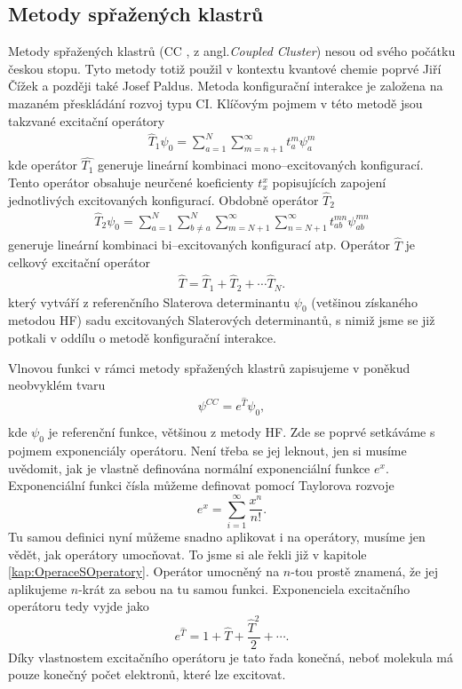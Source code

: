 \subsection{Metody spřažených klastrů}
Metody spřažených klastrů (CC , z angl.\textit{Coupled Cluster}) nesou od svého počátku českou stopu. Tyto metody totiž použil v kontextu kvantové chemie poprvé Jiří Čížek a později také Josef Paldus. Metoda konfigurační interakce je založena na mazaném přeskládání rozvoj typu CI. Klíčovým pojmem v této metodě jsou takzvané excitační operátory
\begin{eqnarray}
\hat{T}_1\psi_0=\sum^N_{a=1}\sum_{m=n+1}^\infty t_a^m\psi_a^m 
\end{eqnarray}
kde operátor $\hat{T_1}$ generuje lineární kombinaci mono--excitovaných konfigurací.  Tento operátor obsahuje neurčené koeficienty $t_x^x$ popisujících zapojení jednotlivých excitovaných konfigurací. Obdobně operátor $\hat{T}_2$ 
\begin{eqnarray}
\hat{T}_2\psi_0=\sum_{a=1}^N \sum_{b\neq a}^N\sum_{m=N+1}^\infty \sum_{n=N+1}^\infty t_{ab}^{mn}\psi_{ab}^{mn}
\end{eqnarray}
generuje lineární kombinaci  bi--excitovaných konfigurací atp. Operátor $\hat{T}$ je celkový excitační operátor
\begin{eqnarray}
\hat{T}=\hat{T}_1+\hat{T}_2+\cdots \hat{T}_N.
\end{eqnarray}
který vytváří z referenčního Slaterova determinantu $\psi_0$ (vetšinou získaného metodou HF) sadu excitovaných Slaterových determinantů, s nimiž jsme se již potkali v oddílu o metodě konfigurační interakce. 


Vlnovou funkci v rámci metody spřažených klastrů zapisujeme v poněkud neobvyklém tvaru
\begin{eqnarray}
\psi^{CC} = e^{\hat{T}} \psi_0 ,  \\
\end{eqnarray}
kde $\psi_0$ je referenční funkce, většinou z metody HF. Zde se poprvé setkáváme s pojmem exponenciály operátoru. Není třeba se jej leknout, jen si musíme uvědomit, jak je vlastně definována normální exponenciální funkce $e^x$. Exponenciální funkci čísla můžeme definovat pomocí Taylorova rozvoje
\begin{equation}
e^x=\sum_{i=1}^\infty \frac{x^n}{n!} .
\end{equation}
Tu samou definici nyní můžeme snadno aplikovat i na operátory, musíme jen vědět, jak operátory umocňovat.
To jsme si ale řekli již v kapitole \ref{kap:OperaceSOperatory}. Operátor umocněný na $n$-tou prostě znamená, že jej aplikujeme $n$-krát za sebou na tu samou funkci. Exponenciela excitačního operátoru tedy vyjde jako 
\begin{equation}
e^{\hat{T}} = 1+\hat{T}+\frac{\hat{T}^2}{2}+\cdots.
\end{equation}
Díky vlastnostem excitačního operátoru je tato řada konečná, neboť molekula má pouze konečný počet elektronů, které lze excitovat.

